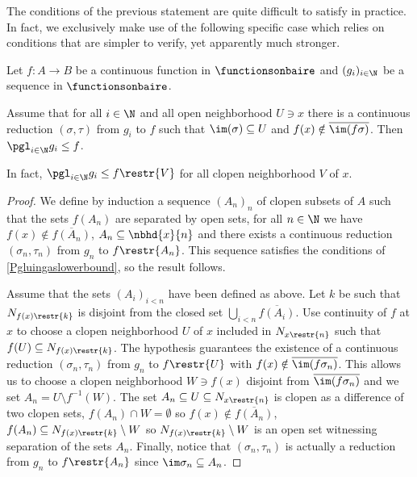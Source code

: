 The conditions of the previous statement are quite difficult to satisfy in practice. In fact, we exclusively make use of the following specific case which relies on conditions that are simpler to verify, yet apparently much stronger. %
\begin{proposition}\label{Pgluingaslowerbound2}
Let $f:A\to B$ be a continuous function in $\functionsonbaire$ and $(g_i)_{i\in\N}$ be a sequence in $\functionsonbaire$.

Assume that %
for all $i\in\N$ and all open neighborhood $U\ni x$
there is a continuous reduction $(\sigma,\tau)$ from $g_i$ to $f$ such that $\im (\sigma )\subseteq U$ and $f(x)\notin\overline{\im(f\sigma)}$.
Then $\pgl_{i\in \N}g_i\leq f$.

In fact, $\pgl_{i\in\N}g_i\leq f\restr{V}$ for all clopen neighborhood $V$ of $x$.
\end{proposition}

\begin{proof}
We define by induction a sequence $(A_n)_n$ of clopen subsets of $A$ such that the sets $f(A_n)$ are separated by open sets,
for all $n\in\N$ we have $f(x)\notin \overline{f(A_n)}$, $A_n\subseteq \nbhd{x}{n}$ and there exists a continuous reduction $(\sigma_n,\tau_n)$ from $g_n$ to $f\restr{A_n}$.
This sequence satisfies the conditions of \cref{Pgluingaslowerbound}, so the result follows.


Assume that the sets $(A_i)_{i<n}$ have been defined as above.
Let $k$ be such that $N_{f(x)\restr{k}}$ is disjoint from the closed set $\bigcup_{i<n}\overline{f(A_i)}$.
Use continuity of $f$ at $x$ to choose a clopen neighborhood $U$ of $x$ included in $N_{x\restr{n}}$ such that $f(U)\subseteq N_{f(x)\restr{k}}$.
The hypothesis guarantees the existence of a continuous reduction $(\sigma_n,\tau_n)$ from $g_n$ to $f\restr{U}$ with $f(x)\notin\overline{\im(f\sigma_n)}$.
This allows us to choose a clopen neighborhood $W\ni f(x)$ disjoint from $\overline{\im(f\sigma_n)}$ and we set $A_n=U\setminus f^{-1}(W)$.
The set $A_n\subseteq U\subseteq N_{x\restr{n}}$ is clopen as a difference of two clopen sets, $f(A_n)\cap W=\emptyset$ so $f(x)\notin \overline{f(A_n)}$,
$f(A_n)\subseteq N_{f(x)\restr{k}}\setminus W$ so $N_{f(x)\restr{k}}\setminus W$ is an open set witnessing separation of the sets $A_n$.
Finally, notice that $(\sigma_n,\tau_n)$ is actually a reduction from $g_n$ to $f\restr{A_n}$ since $\im \sigma_n \subseteq A_n$.
 \end{proof}

